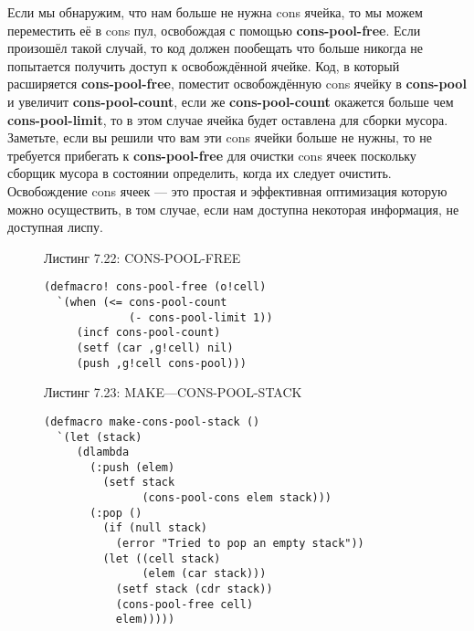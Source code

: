 Если мы обнаружим, что нам больше не нужна cons ячейка, то мы можем переместить её в cons пул, освобождая с помощью \textbf{cons-pool-free}. Если произошёл такой случай, то код должен пообещать что больше никогда не попытается получить доступ к освобождённой ячейке. Код, в который расширяется \textbf{cons-pool-free}, поместит освобождённую cons ячейку в \textbf{cons-pool} и увеличит \textbf{cons-pool-count}, если же \textbf{cons-pool-count} окажется больше чем \textbf{cons-pool-limit}, то в этом случае ячейка будет оставлена для сборки мусора. Заметьте, если вы решили что вам эти cons ячейки больше не нужны, то не требуется прибегать к \textbf{cons-pool-free} для очистки cons ячеек поскольку сборщик мусора в состоянии определить, когда их следует очистить. Освобождение cons ячеек --- это простая и эффективная оптимизация которую можно осуществить, в том случае, если нам доступна некоторая информация, не доступная лиспу.

\begin{figure}Листинг 7.22: CONS-POOL-FREE\label{listing_7.22}
\listbegin
\begin{verbatim}
(defmacro! cons-pool-free (o!cell)
  `(when (<= cons-pool-count
             (- cons-pool-limit 1))
     (incf cons-pool-count)
     (setf (car ,g!cell) nil)
     (push ,g!cell cons-pool)))
\end{verbatim}
\listend
\end{figure}

\begin{figure}Листинг 7.23: MAKE—CONS-POOL-STACK\label{listing_7.23}
\listbegin
\begin{verbatim}
(defmacro make-cons-pool-stack ()
  `(let (stack)
     (dlambda
       (:push (elem)
         (setf stack
               (cons-pool-cons elem stack)))
       (:pop ()
         (if (null stack)
           (error "Tried to pop an empty stack"))
         (let ((cell stack)
               (elem (car stack)))
           (setf stack (cdr stack))
           (cons-pool-free cell)
           elem)))))
\end{verbatim}
\listend
\end{figure}

